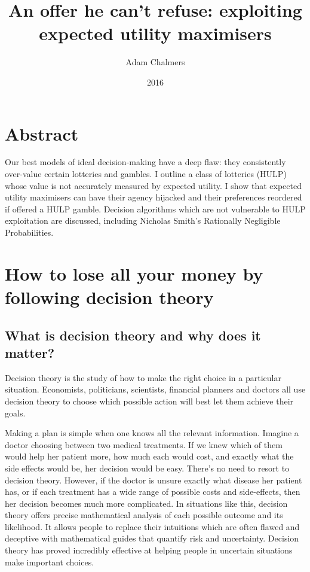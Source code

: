 \documentclass{article}
\title{An offer he can't refuse: exploiting expected utility maximisers}
\author{Adam Chalmers}
\date{2016}
\begin{document}
\frenchspacing
\maketitle


\section{Abstract}
Our best models of ideal decision-making have a deep flaw: they consistently over-value certain lotteries and gambles. I outline a class of lotteries (HULP) whose value is not accurately measured by expected utility. I show that expected utility maximisers can have their agency hijacked and their preferences reordered if offered a HULP gamble. Decision algorithms which are not vulnerable to HULP exploitation are discussed, including Nicholas Smith's Rationally Negligible Probabilities.

\section{How to lose all your money by following decision theory}
\subsection{What is decision theory and why does it matter?}

Decision theory is the study of how to make the right choice in a particular situation. Economists, politicians, scientists, financial planners and doctors all use decision theory to choose which possible action will best let them achieve their goals.

Making a plan is simple when one knows all the relevant information. Imagine a doctor choosing between two medical treatments. If we knew which of them would help her patient more, how much each would cost, and exactly what the side effects would be, her decision would be easy. There's no need to resort to decision theory. However, if the doctor is unsure exactly what disease her patient has, or if each treatment has a wide range of possible costs and side-effects, then her decision becomes much more complicated. In situations like this, decision theory offers precise mathematical analysis of each possible outcome and its likelihood. It allows people to replace their intuitions \textemdash which are often flawed and deceptive \textemdash with mathematical guides that quantify risk and uncertainty. Decision theory has proved incredibly effective at helping people in uncertain situations make important choices. 
\end{document}
